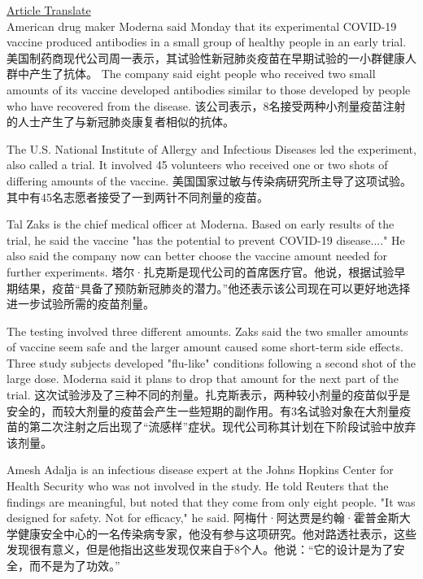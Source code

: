 \href{https://www.51voa.com/VOA_Special_English/moderna-says-early-coronavirus-vaccine-shows-promise-84567_1.html}{Article Translate} \\

American drug maker Moderna said Monday that its experimental COVID-19 vaccine produced antibodies in a small group of healthy people in an early trial.
美国制药商现代公司周一表示，其试验性新冠肺炎疫苗在早期试验的一小群健康人群中产生了抗体。
The company said eight people who received two small amounts of its vaccine developed antibodies similar to those developed by people who have recovered from the disease.
该公司表示，8名接受两种小剂量疫苗注射的人士产生了与新冠肺炎康复者相似的抗体。

The U.S. National Institute of Allergy and Infectious Diseases led the experiment, also called a trial. It involved 45 volunteers who received one or two shots of differing amounts of the vaccine.
美国国家过敏与传染病研究所主导了这项试验。其中有45名志愿者接受了一到两针不同剂量的疫苗。

Tal Zaks is the chief medical officer at Moderna. Based on early results of the trial, he said the vaccine "has the potential to prevent COVID-19 disease...." He also said the company now can better choose the vaccine amount needed for further experiments.
塔尔·扎克斯是现代公司的首席医疗官。他说，根据试验早期结果，疫苗“具备了预防新冠肺炎的潜力。”他还表示该公司现在可以更好地选择进一步试验所需的疫苗剂量。

The testing involved three different amounts. Zaks said the two smaller amounts of vaccine seem safe and the larger amount caused some short-term side effects. Three study subjects developed "flu-like" conditions following a second shot of the large dose. Moderna said it plans to drop that amount for the next part of the trial.
这次试验涉及了三种不同的剂量。扎克斯表示，两种较小剂量的疫苗似乎是安全的，而较大剂量的疫苗会产生一些短期的副作用。有3名试验对象在大剂量疫苗的第二次注射之后出现了“流感样”症状。现代公司称其计划在下阶段试验中放弃该剂量。

Amesh Adalja is an infectious disease expert at the Johns Hopkins Center for Health Security who was not involved in the study. He told Reuters that the findings are meaningful, but noted that they come from only eight people. "It was designed for safety. Not for efficacy," he said.
阿梅什·阿达贾是约翰·霍普金斯大学健康安全中心的一名传染病专家，他没有参与这项研究。他对路透社表示，这些发现很有意义，但是他指出这些发现仅来自于8个人。他说：“它的设计是为了安全，而不是为了功效。”


